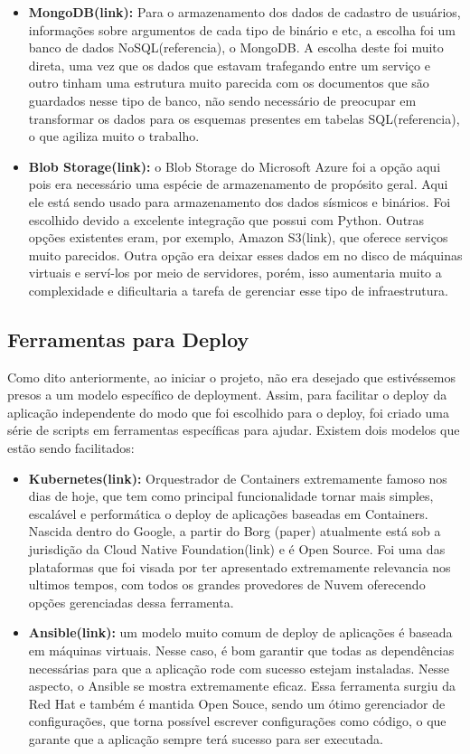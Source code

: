 \documentclass[11pt,twoside]{article}
\begin{document}
\begin{itemize}
  \item \textbf{MongoDB(link):} Para o armazenamento dos dados de cadastro de usuários, informações sobre argumentos de cada tipo de binário e etc, a escolha foi um banco de dados NoSQL(referencia), o MongoDB. A escolha deste
  foi muito direta, uma vez que os dados que estavam trafegando entre um serviço e outro tinham uma estrutura muito parecida com os documentos que são guardados nesse tipo de banco, não sendo necessário de preocupar
  em transformar os dados para os esquemas presentes em tabelas SQL(referencia), o que agiliza muito o trabalho.

  \item \textbf{Blob Storage(link):} o Blob Storage do Microsoft Azure foi a opção aqui pois era necessário uma espécie de armazenamento de propósito geral. Aqui ele está sendo usado para armazenamento dos dados sísmicos e
  binários. Foi escolhido devido a excelente integração que possui com Python. Outras opções existentes eram, por exemplo, Amazon S3(link), que oferece serviços muito parecidos. Outra opção era deixar esses dados em 
  no disco de máquinas virtuais e serví-los por meio de servidores, porém, isso aumentaria muito a complexidade e dificultaria a tarefa de gerenciar esse tipo de infraestrutura.
\end{itemize}

\subsection{Ferramentas para Deploy}

Como dito anteriormente, ao iniciar o projeto, não era desejado que estivéssemos presos a um modelo específico de deployment. Assim, para facilitar o deploy da aplicação independente
do modo que foi escolhido para o deploy, foi criado uma série de scripts em ferramentas específicas para ajudar. Existem dois modelos que estão sendo facilitados:

\begin{itemize}
  \item \textbf{Kubernetes(link):} Orquestrador de Containers extremamente famoso nos dias de hoje, que tem como principal funcionalidade tornar mais simples, escalável e performática o deploy 
  de aplicações baseadas em Containers. Nascida dentro do Google, a partir do Borg (paper) atualmente está sob a jurisdição da Cloud Native Foundation(link) e é Open Source. Foi uma
  das plataformas que foi visada por ter apresentado extremamente relevancia nos ultimos tempos, com todos os grandes provedores de Nuvem oferecendo opções gerenciadas dessa 
  ferramenta.
  \item \textbf{Ansible(link):} um modelo muito comum de deploy de aplicações é baseada em máquinas virtuais. Nesse caso, é bom garantir que todas as dependências necessárias para que a 
  aplicação rode com sucesso estejam instaladas. Nesse aspecto, o Ansible se mostra extremamente eficaz. Essa ferramenta surgiu da Red Hat e também é mantida Open Souce, sendo um
  ótimo gerenciador de configurações, que torna possível escrever configurações como código, o que garante que a aplicação sempre terá sucesso para ser executada.
\end{itemize}
\end{document}
